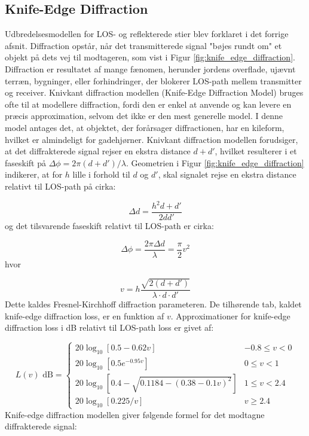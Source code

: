 \documentclass[a4paper,12pt]{book}
\begin{document}
	\subsection{Knife-Edge Diffraction} Udbredelsesmodellen for LOS- og reflekterede stier blev forklaret i det forrige afsnit. Diffraction opstår, når det transmitterede signal "bøjes rundt om" et objekt på dets vej til modtageren, som vist i Figur \ref{fig:knife_edge_diffraction}. Diffraction er resultatet af mange fænomen, herunder jordens overflade, ujævnt terræn, bygninger, eller forhindringer, der blokerer LOS-path mellem transmitter og receiver.
	\newline\newline\noindent Knivkant diffraction modellen (Knife-Edge Diffraction Model) bruges ofte til at modellere diffraction, fordi den er enkel at anvende og kan levere en præcis approximation, selvom det ikke er den mest generelle model. I denne model antages det, at objektet, der forårsager diffractionen, har en kileform, hvilket er almindeligt for gadehjørner. Knivkant diffraction modellen forudsiger, at det diffrakterede signal rejser en ekstra distance \( d + d' \), hvilket resulterer i et faseskift på \( \Delta \phi = 2\pi(d + d')/\lambda \). Geometrien i Figur \ref{fig:knife_edge_diffraction} indikerer, at for \( h \) lille i forhold til \( d \) og \( d' \), skal signalet rejse en ekstra distance relativt til LOS-path på cirka:

	\[
	\Delta d = \frac{h^2 d + d'}{2 dd'}
	\]
	og det tilsvarende faseskift relativt til LOS-path er cirka:

	\[
	\Delta \phi = \frac{2\pi \Delta d}{\lambda} = \frac{\pi}{2} v^2
	\]
	hvor
	
	\[
	v = h \frac{\sqrt{2(d+d')}}{\lambda \cdot d \cdot d'}
	\]
	\noindent Dette kaldes Fresnel-Kirchhoff diffraction parameteren. De tilhørende tab, kaldet knife-edge diffraction loss, er en funktion af \( v \). Approximationer for knife-edge diffraction loss i dB relativt til LOS-path loss er givet af:

	\[
	L(v) \text{ dB} = \left\{
	\begin{array}{ll}
		20 \log_{10}[0.5 - 0.62v] & -0.8 \leq v < 0 \\
		20 \log_{10}[0.5e^{-0.95v}] & 0 \leq v < 1 \\
		20 \log_{10}[0.4 - \sqrt{0.1184 - (0.38 - 0.1v)^2}] & 1 \leq v < 2.4 \\
		20 \log_{10}[0.225/v] & v \geq 2.4
	\end{array}
	\right.
	\]
	\noindent Knife-edge diffraction modellen giver følgende formel for det modtagne diffrakterede signal:
\end{document}
